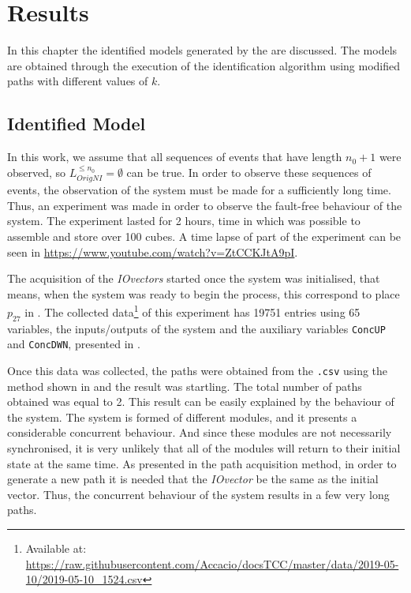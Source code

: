 \chapter{Results}
\label{cha:results}
In this chapter the identified models generated by the
 are discussed. The models are obtained through the
execution of the identification algorithm using modified paths with different
values of $k$.

\section{Identified Model}
In this work, we assume that all
sequences of events that have length $n_0+1$ were observed, so 
$L_{OrigNI}^{\leq n_0}=\emptyset$ can be true. In order to observe these
sequences of events, the observation of the system must be made for a sufficiently
long time. Thus, an experiment was made in order to observe the fault-free
behaviour of the system. The experiment lasted for 2
hours, time in which was possible to assemble and store over 100 cubes. A time
lapse of part of the experiment can be seen in
\url{https://www.youtube.com/watch?v=ZtCCKJtA9pI}.

The acquisition of the \emph{IOvectors} started once the system was initialised, that means,
when the system was ready to begin the process, this correspond to place
\hyperlink{partialTable:p27}{$p_{27}$} in .
The collected data\footnote{Available at:
  \url{https://raw.githubusercontent.com/Accacio/docsTCC/master/data/2019-05-10/2019-05-10_1524.csv}}
of this experiment has 19751 entries using 65
variables, the inputs\slash outputs of the system and the auxiliary variables
\verb|ConcUP| and \verb|ConcDWN|, presented in .

Once this data was collected, the paths were obtained from the \verb|.csv| using
the method shown in  and the
result was startling. The total number of paths obtained was equal to
2. This result can be easily explained by the behaviour of the system. The
system is formed of different modules, and it presents a considerable concurrent behaviour. And since these modules are not necessarily
synchronised, it is very unlikely that all of the modules will return to their initial
state at the same time. As presented in the path acquisition method, in order to generate
a new path it is needed that the \emph{IOvector} be the same as the initial
vector. Thus, the concurrent behaviour of the system results in a few very long paths. 


